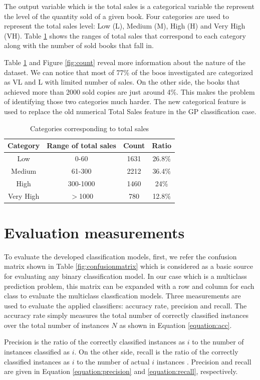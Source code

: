 \documentclass{llncs}
\begin{document}
The output variable which is the total sales is a categorical variable the represent the level of the quantity sold of a given book. Four categories are used to represent the total sales level: Low (L), Medium (M), High (H) and Very High (VH). Table \ref{table:freq} shows the ranges of total sales that correspond to each category along with the number of sold books that fall in. 

Table \ref{table:freq} and Figure \ref{fig:count} reveal more information about the nature of the dataset. We can notice that most of 77\% of the boos investigated are categorized as VL and L with limited number of sales. On the other side, the books that achieved more than 2000 sold copies are just around 4\%. This makes the problem of identifying those two categories much harder. The new categorical feature is used to replace the old numerical Total Sales feature in the GP classification case.

\begin{table}[ht]
\caption{Categories corresponding to total sales }
\centering{}%
\begin{tabular}{|c|c|c|c|}
\hline 
Category & Range of total sales & Count & Ratio\tabularnewline
\hline 
\hline 
Low & 0-60 & 1631 & 26.8\%\tabularnewline
\hline 
Medium & 61-300 & 2212 & 36.4\%\tabularnewline
\hline 
High & 300-1000 & 1460 & 24\%\tabularnewline
\hline 
Very High & $>$1000 & 780 & 12.8\%\tabularnewline
\hline 
\end{tabular}
\label{table:freq}
\end{table}



\section{Evaluation measurements}

To evaluate the developed classification models, first, we refer the confusion matrix shown in Table \ref{fig:confusionmatrix} which is considered as a basic source for evaluating any binary classification model. In our case which is a multiclass prediction problem, this matrix can be expanded with a row and column for each class to evaluate the multiclass classfication models. Three measurements are used to evaluate the applied classifiers: accuracy rate, precision and recall. The accuracy rate simply measures the total number of correctly classified instances over the total number of instances $N$ as shown in Equation \ref{equation:acc}.

Precision is the ratio of the correctly classified instances as $i$ to the number of instances classified as $i$. On the other side, recall is the ratio of the correctly classified instances as $i$ to the number of actual $i$ instances . Precision and recall are given in Equation \ref{equation:precision} and \ref{equation:recall}, respectively.
\end{document}
